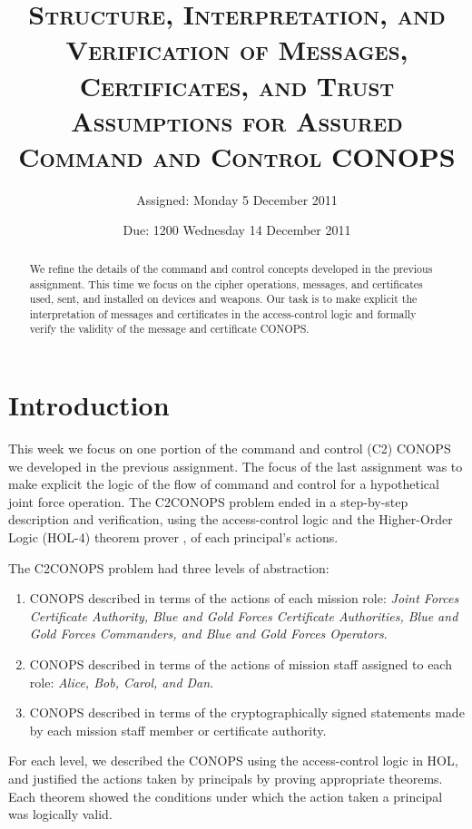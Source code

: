 \documentclass[10pt,twoside]{article}
\title{\textsc{Structure, Interpretation, and Verification of
    Messages, Certificates, and Trust Assumptions for Assured Command
    and Control CONOPS}}
\author{Assigned: Monday 5 December 2011}
\date{Due: 1200 Wednesday 14 December 2011}
\begin{document}






\maketitle
\thispagestyle{empty}
\author{}
\maketitle

\begin{abstract}
  We refine the details of the command and control concepts developed
  in the previous assignment. This time we focus on the cipher
  operations, messages, and certificates used, sent, and installed on
  devices and weapons. Our task is to make explicit the interpretation
  of messages and certificates in the access-control logic and
  formally verify the validity of the message and certificate CONOPS.
\end{abstract}

\section{Introduction}
\label{sec:introduction}

This week we focus on one portion of the command and control (C2)
CONOPS we developed in the previous assignment. The focus of the last
assignment was to make explicit the logic of the flow of command and
control for a hypothetical joint force operation.  The C2CONOPS
problem ended in a step-by-step description and verification, using
the access-control logic \cite{ACST} and the Higher-Order Logic
(HOL-4) theorem prover \cite{HOL}, of each principal's actions.

The C2CONOPS problem had three levels of abstraction:
\begin{enumerate}
\item CONOPS described in terms of the actions of each mission role:
  \emph{Joint Forces Certificate Authority, Blue and Gold Forces
    Certificate Authorities, Blue and Gold Forces Commanders, and Blue
    and Gold Forces Operators}.
\item CONOPS described in terms of the actions of mission staff
  assigned to each role: \emph{Alice, Bob, Carol, and Dan}.
\item CONOPS described in terms of the cryptographically signed
  statements made by each mission staff member or certificate
  authority.
\end{enumerate}
For each level, we described the CONOPS using the access-control logic
in HOL, and justified the actions taken by principals by proving
appropriate theorems. Each theorem showed the conditions under which
the action taken a principal was logically valid.
\end{document}

